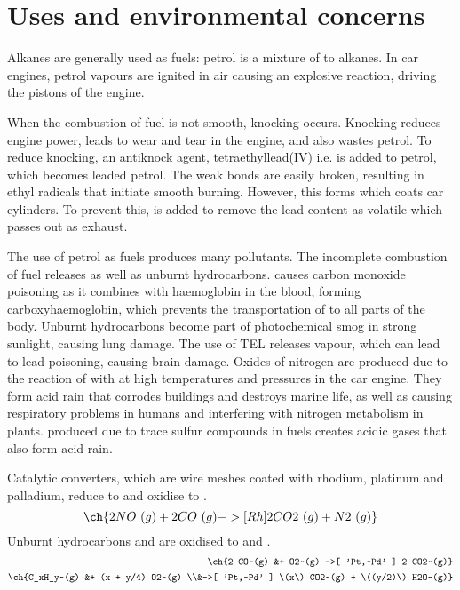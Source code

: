 \documentclass[Chemistry.tex]{subfiles}
\begin{document}
\section{Uses and environmental concerns}
Alkanes are generally used as fuels: petrol is a mixture of  to  alkanes. In car engines, petrol vapours are ignited in air causing an explosive reaction, driving the pistons of the engine.

When the combustion of fuel is not smooth, knocking occurs. Knocking reduces engine power, leads to wear and tear in the engine, and also wastes petrol. To reduce knocking, an antiknock agent, tetraethyllead(IV) i.e.  is added to petrol, which becomes leaded petrol. The weak  bonds are easily broken, resulting in ethyl radicals that initiate smooth burning. However, this forms  which coats car cylinders. To prevent this,  is added to remove the lead content as volatile  which passes out as exhaust.

The use of petrol as fuels produces many pollutants. The incomplete combustion of fuel releases  as well as unburnt hydrocarbons.  causes carbon monoxide poisoning as it combines with haemoglobin in the blood, forming carboxyhaemoglobin, which prevents the transportation of  to all parts of the body. Unburnt hydrocarbons become part of photochemical smog in strong sunlight, causing lung damage. The use of TEL releases  vapour, which can lead to lead poisoning, causing brain damage. Oxides of nitrogen are produced due to the reaction of  with  at high temperatures and pressures in the car engine. They form acid rain that corrodes buildings and destroys marine life, as well as causing respiratory problems in humans and interfering with nitrogen metabolism in plants.  produced due to trace sulfur compounds in fuels creates acidic gases that also form acid rain.

Catalytic converters, which are wire meshes coated with rhodium, platinum and palladium, reduce  to  and oxidise  to . \begin{equation}\ch{2 NO~(g) + 2 CO~(g) ->[Rh] 2 CO2~(g) + N2~(g)}\end{equation} Unburnt hydrocarbons and  are oxidised to  and . \begin{align}\ch{2 CO~(g) &+ O2~(g) ->[ 'Pt,~Pd' ] 2 CO2~(g)}\\\begin{split}\ch{C_xH_y~(g) &+ (x + y/4) O2~(g) \\&->[ 'Pt,~Pd' ] \(x\) CO2~(g) + \((y/2)\) H2O~(g)}\end{split}\end{align}
\end{document}
